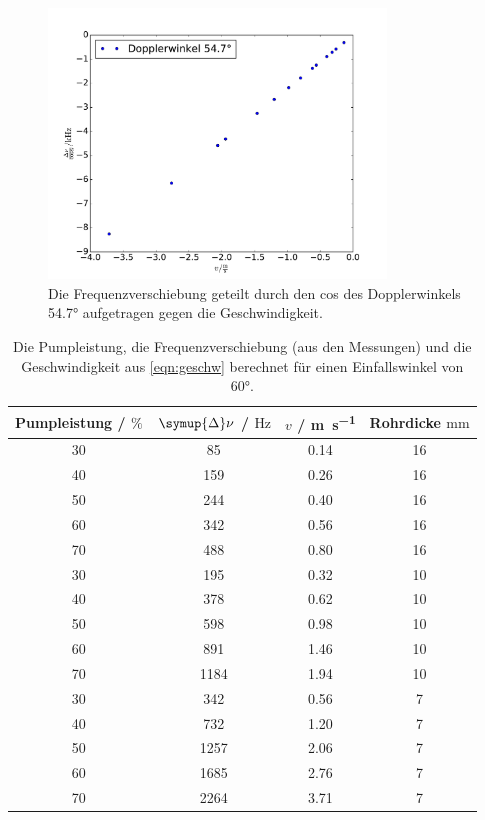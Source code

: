 \documentclass[
  bibliography=totoc,     %
  captions=tableheading,  %
  titlepage=firstiscover, %
]{scrartcl}
\begin{document}
      \begin{figure}
        \centering
          \includegraphics[width=0.8\textwidth]{a60.pdf}
          \caption{Die Frequenzverschiebung geteilt durch den cos des
          Dopplerwinkels 54.7° aufgetragen gegen die Geschwindigkeit.}
          \label{fig:3}
      \end{figure}

      \begin{table}
        \centering
        \begin{tabular}{c c c c}
          \toprule
          {Pumpleistung / $\si{\percent}$} & {$\symup{\Delta} \nu$ / $\si{\hertz}$} & {$v$ /
          \si{\meter\per\second}} & {Rohrdicke $\si{\milli\meter}$} \\
          \midrule
          30 & 85 & 0.14 & 16\\
          40 & 159 & 0.26 & 16\\
          50 & 244 & 0.40 & 16\\
          60 & 342 & 0.56 & 16\\
          70 & 488 & 0.80 & 16\\
          30 & 195 & 0.32 & 10\\
          40 & 378 & 0.62 & 10\\
          50 & 598 & 0.98 & 10\\
          60 & 891 & 1.46 & 10\\
          70 & 1184 & 1.94 & 10\\
          30 & 342 & 0.56 & 7\\
          40 & 732 & 1.20 & 7\\
          50 & 1257 & 2.06 & 7\\
          60 & 1685 & 2.76 & 7\\
          70 & 2264 & 3.71 & 7\\
          \bottomrule
        \end{tabular}
        \caption{Die Pumpleistung, die Frequenzverschiebung (aus den Messungen)
        und die Geschwindigkeit aus \eqref{eqn:geschw} berechnet für einen
        Einfallswinkel von 60°.}
        \label{tab:4}
      \end{table}
\end{document}
